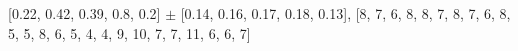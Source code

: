 
[0.22, 0.42, 0.39, 0.8, 0.2] $\pm$ [0.14, 0.16, 0.17, 0.18, 0.13], [8, 7, 6, 8, 8, 7, 8, 7, 6, 8, 5, 5, 8, 6, 5, 4, 4, 9, 10, 7, 7, 11, 6, 6, 7]\\
